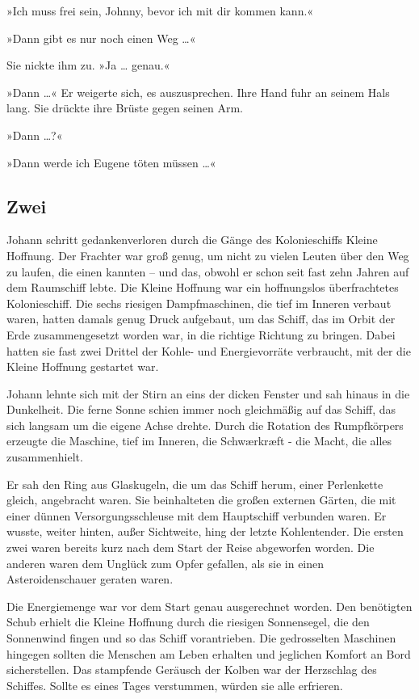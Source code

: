 »Ich muss frei sein, Johnny, bevor ich mit dir kommen kann.«

»Dann gibt es nur noch einen Weg …«

Sie nickte ihm zu. »Ja … genau.«

»Dann …« Er weigerte sich, es auszusprechen. Ihre Hand fuhr an
seinem Hals lang. Sie drückte ihre Brüste gegen seinen Arm.

»Dann …?«

»Dann werde ich Eugene töten müssen \ldots{}«

\subsection{Zwei}

\bigpar

Johann schritt gedankenverloren durch die Gänge des Kolonieschiffs
Kleine Hoffnung. Der Frachter war groß genug, um nicht zu vielen
Leuten über den Weg zu laufen, die einen kannten – und das, obwohl
er schon seit fast zehn Jahren auf dem Raumschiff lebte. Die Kleine
Hoffnung war ein hoffnungslos überfrachtetes Kolonieschiff. Die
sechs riesigen Dampfmaschinen, die tief im Inneren verbaut waren,
hatten damals genug Druck aufgebaut, um das Schiff, das im Orbit
der Erde zusammengesetzt worden war, in die richtige Richtung zu
bringen. Dabei hatten sie fast zwei Drittel der Kohle- und
Energievorräte verbraucht, mit der die Kleine Hoffnung gestartet
war.

Johann lehnte sich mit der Stirn an eins der dicken Fenster und sah
hinaus in die Dunkelheit. Die ferne Sonne schien immer noch
gleichmäßig auf das Schiff, das sich langsam um die eigene Achse
drehte. Durch die Rotation des Rumpfkörpers erzeugte die Maschine,
tief im Inneren, die Schwærkræft - die Macht, die alles
zusammenhielt.

Er sah den Ring aus Glaskugeln, die um das Schiff herum, einer
Perlenkette gleich, angebracht waren. Sie beinhalteten die großen
externen Gärten, die mit einer dünnen Versorgungsschleuse mit dem
Hauptschiff verbunden waren. Er wusste, weiter hinten, außer
Sichtweite, hing der letzte Kohlentender. Die ersten zwei waren
bereits kurz nach dem Start der Reise abgeworfen worden. Die
anderen waren dem Unglück zum Opfer gefallen, als sie in einen
Asteroidenschauer geraten waren.

Die Energiemenge war vor dem Start genau ausgerechnet worden. Den
benötigten Schub erhielt die Kleine Hoffnung durch die riesigen
Sonnensegel, die den Sonnenwind fingen und so das Schiff
vorantrieben. Die gedrosselten Maschinen hingegen sollten die
Menschen am Leben erhalten und jeglichen Komfort an Bord
sicherstellen. Das stampfende Geräusch der Kolben war der
Herzschlag des Schiffes. Sollte es eines Tages verstummen, würden
sie alle erfrieren.

